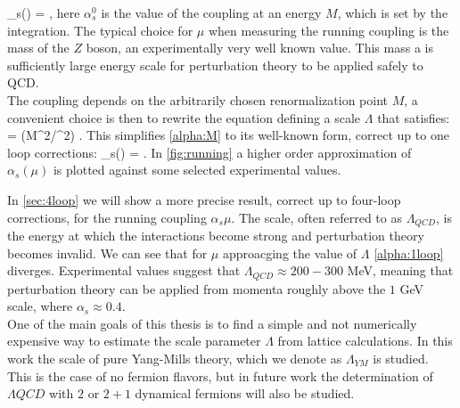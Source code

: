 \beq
    \alpha_s(\mu) = ,
    \label{alpha:M}
\eeq  
here $\alpha_s^0$ is the value of the coupling at an energy $M$, which is set by the integration. The typical choice for $\mu$ when measuring the running coupling is the mass of the $Z$ boson, an experimentally very well known value. This mass a is sufficiently large energy scale for perturbation theory to be applied safely to QCD. \\
The coupling depends on the arbitrarily chosen renormalization point $M$, a convenient choice is then to rewrite the equation defining a scale $\Lambda$ that satisfies:
 = \log(M^2/\Lambda^2) .
\eeq  
This simplifies \cref{alpha:M} to its well-known form, correct up to one loop corrections:
\beq
    \alpha_s(\mu) = .
    \label{alpha:1loop} 
\eeq
In \cref{fig:running} a higher order approximation of $\alpha_s(\mu)$ is plotted against some selected experimental values.  

In \cref{sec:4loop} we will show a more precise result, correct up to four-loop corrections, for the running coupling $\alpha_s{\mu}$. The scale, often referred to as $\Lambda_{QCD}$, is the energy at which the interactions become strong and perturbation theory becomes invalid. We can see that for $\mu$ approacging the value of $\Lambda$ \cref{alpha:1loop} diverges. Experimental values \cite{dissertori_9._2016} suggest that $\Lambda_{QCD} \approx 200-300$ MeV, meaning that perturbation theory can be applied from momenta roughly above the $1$ GeV scale, where $\alpha_s\approx 0.4$. \\
One of the main goals of this thesis is to find a simple and not numerically expensive way to estimate the scale parameter $\Lambda$ from lattice calculations. In this work the scale of pure Yang-Mills theory, which we denote as $\Lambda_{YM}$ is studied. This is the case of no fermion flavors, but in future work the determination of $\Lambda{QCD}$ with $2$ or $2+1$ dynamical fermions will also be studied. 

